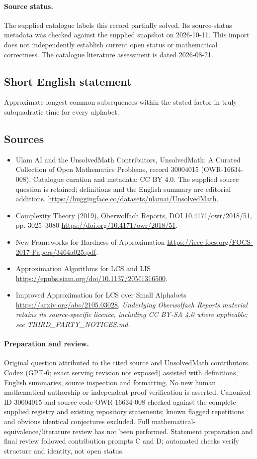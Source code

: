 \documentclass[11pt]{article}
\begin{document}
\paragraph{Source status.}
The supplied catalogue labels this record partially solved. Its source-status metadata was checked against the supplied snapshot on 2026-10-11. This import does not independently establish current open status or mathematical correctness. The catalogue literature assessment is dated 2026-08-21.
\subsection{Short English statement}
Approximate longest common subsequences within the stated factor in truly subquadratic time for every alphabet.
\subsection{Sources}
\begin{itemize}
\item[S1] Ulam AI and the UnsolvedMath Contributors, UnsolvedMath: A Curated Collection of Open Mathematics Problems, record 30004015 (OWR-16634-008). Catalogue curation and metadata: CC BY 4.0. The supplied source question is retained; definitions and the English summary are editorial additions.
\url{https://huggingface.co/datasets/ulamai/UnsolvedMath}.
\item[S2] Complexity Theory (2019), Oberwolfach Reports, DOI 10.4171/owr/2018/51, pp. 3025--3080
\url{https://doi.org/10.4171/owr/2018/51}.
\item[S3] New Frameworks for Hardness of Approximation
\url{https://ieee-focs.org/FOCS-2017-Papers/3464a025.pdf}.
\item[S4] Approximation Algorithms for LCS and LIS
\url{https://epubs.siam.org/doi/10.1137/20M1316500}.
\item[S5] Improved Approximation for LCS over Small Alphabets
\url{https://arxiv.org/abs/2105.03028}.
\textit{Underlying Oberwolfach Reports material retains its source-specific licence, including CC BY-SA 4.0 where applicable; see THIRD\_PARTY\_NOTICES.md.}
\end{itemize}
\paragraph{Preparation and review.}
Original question attributed to the cited source and UnsolvedMath contributors. Codex (GPT-6; exact serving revision not exposed) assisted with definitions, English summaries, source inspection and formatting. No new human mathematical authorship or independent proof verification is asserted. Canonical ID 30004015 and source code OWR-16634-008 checked against the complete supplied registry and existing repository statements; known flagged repetitions and obvious identical conjectures excluded. Full mathematical-equivalence/literature review has not been performed. Statement preparation and final review followed contribution prompts C and D; automated checks verify structure and identity, not open status.
\label{end:30004015}
\end{document}

